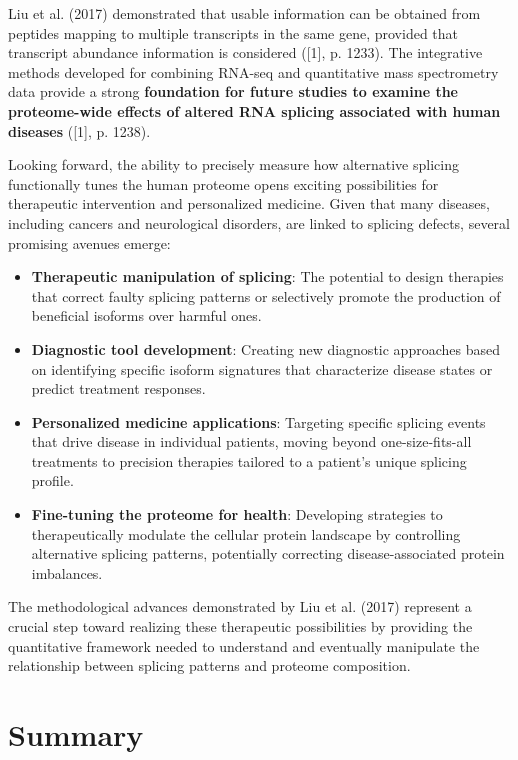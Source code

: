 \documentclass[12pt,a4paper]{article}
\begin{document}
Liu et al. (2017) demonstrated that usable information can be obtained from peptides mapping to multiple transcripts in the same gene, provided that transcript abundance information is considered ([1], p. 1233). The integrative methods developed for combining RNA-seq and quantitative mass spectrometry data provide a strong \textbf{foundation for future studies to examine the proteome-wide effects of altered RNA splicing associated with human diseases} ([1], p. 1238).

Looking forward, the ability to precisely measure how alternative splicing functionally tunes the human proteome opens exciting possibilities for therapeutic intervention and personalized medicine. Given that many diseases, including cancers and neurological disorders, are linked to splicing defects, several promising avenues emerge:

\begin{itemize}
    \item \textbf{Therapeutic manipulation of splicing}: The potential to design therapies that correct faulty splicing patterns or selectively promote the production of beneficial isoforms over harmful ones.
    \item \textbf{Diagnostic tool development}: Creating new diagnostic approaches based on identifying specific isoform signatures that characterize disease states or predict treatment responses.
    \item \textbf{Personalized medicine applications}: Targeting specific splicing events that drive disease in individual patients, moving beyond one-size-fits-all treatments to precision therapies tailored to a patient's unique splicing profile.
    \item \textbf{Fine-tuning the proteome for health}: Developing strategies to therapeutically modulate the cellular protein landscape by controlling alternative splicing patterns, potentially correcting disease-associated protein imbalances.
\end{itemize}

The methodological advances demonstrated by Liu et al. (2017) represent a crucial step toward realizing these therapeutic possibilities by providing the quantitative framework needed to understand and eventually manipulate the relationship between splicing patterns and proteome composition.

\section{Summary}
\end{document}

